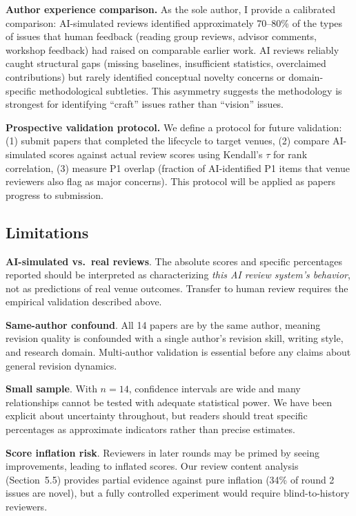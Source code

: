 \textbf{Author experience comparison.} As the sole author, I provide a calibrated comparison: AI-simulated reviews identified approximately 70--80\% of the types of issues that human feedback (reading group reviews, advisor comments, workshop feedback) had raised on comparable earlier work. AI reviews reliably caught structural gaps (missing baselines, insufficient statistics, overclaimed contributions) but rarely identified conceptual novelty concerns or domain-specific methodological subtleties. This asymmetry suggests the methodology is strongest for identifying ``craft'' issues rather than ``vision'' issues.

\textbf{Prospective validation protocol.} We define a protocol for future validation: (1) submit papers that completed the lifecycle to target venues, (2) compare AI-simulated scores against actual review scores using Kendall's $\tau$ for rank correlation, (3) measure P1 overlap (fraction of AI-identified P1 items that venue reviewers also flag as major concerns). This protocol will be applied as papers progress to submission.

\subsection{Limitations}

\textbf{AI-simulated vs.\ real reviews}. The absolute scores and specific percentages reported should be interpreted as characterizing \emph{this AI review system's behavior}, not as predictions of real venue outcomes. Transfer to human review requires the empirical validation described above.

\textbf{Same-author confound}. All 14 papers are by the same author, meaning revision quality is confounded with a single author's revision skill, writing style, and research domain. Multi-author validation is essential before any claims about general revision dynamics.

\textbf{Small sample}. With $n=14$, confidence intervals are wide and many relationships cannot be tested with adequate statistical power. We have been explicit about uncertainty throughout, but readers should treat specific percentages as approximate indicators rather than precise estimates.

\textbf{Score inflation risk}. Reviewers in later rounds may be primed by seeing improvements, leading to inflated scores. Our review content analysis (Section~5.5) provides partial evidence against pure inflation (34\% of round 2 issues are novel), but a fully controlled experiment would require blind-to-history reviewers.

